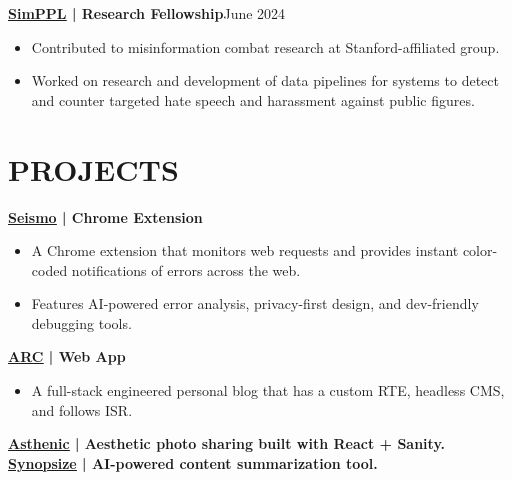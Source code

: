 \documentclass[a4paper,11pt]{article}
\newcommand{\entry}[2]{
  \noindent\textbf{#1}\hfill{#2}\\[-1em]
}
\newcommand{\contactlink}[2]{
    \href{#1}{\color{cyan}\underline{#2}}
}
\newenvironment{itemizeWithPadding}{
  \begin{itemize}
}{
  \end{itemize}
  \vspace{0.5em} %
}
\begin{document}
\entry{\contactlink{https://simppl.org/}{SimPPL} | Research Fellowship}{June 2024}
\begin{itemizeWithPadding}
  \item Contributed to misinformation combat research at Stanford-affiliated group.
  \item Worked on research and development of data pipelines for systems to detect and counter targeted hate speech and harassment against public figures.
\end{itemizeWithPadding}

\section*{PROJECTS}

\entry{\contactlink{https://seismo.abhigyan.tech}{Seismo} | Chrome Extension}{}
\begin{itemizeWithPadding}
  \item A Chrome extension that monitors web requests and provides instant color-coded notifications of errors across the web.
  \item Features AI-powered error analysis, privacy-first design, and dev-friendly debugging tools.
\end{itemizeWithPadding}

\entry{\contactlink{https://abhigyan.tech/blog}{ARC} | Web App}{}
\begin{itemizeWithPadding}
  \item A full-stack engineered personal blog that has a custom RTE, headless CMS, and follows ISR.
\end{itemizeWithPadding}

\entry{\contactlink{https://asthenic.vercel.app/}{Asthenic} | Aesthetic photo sharing built with React + Sanity.}{} 

\entry{\contactlink{https://github.com/AbhigyanBafna/Synopsize}{Synopsize} | AI-powered content summarization tool.}
\\
\vspace{-2em}
\end{document}
